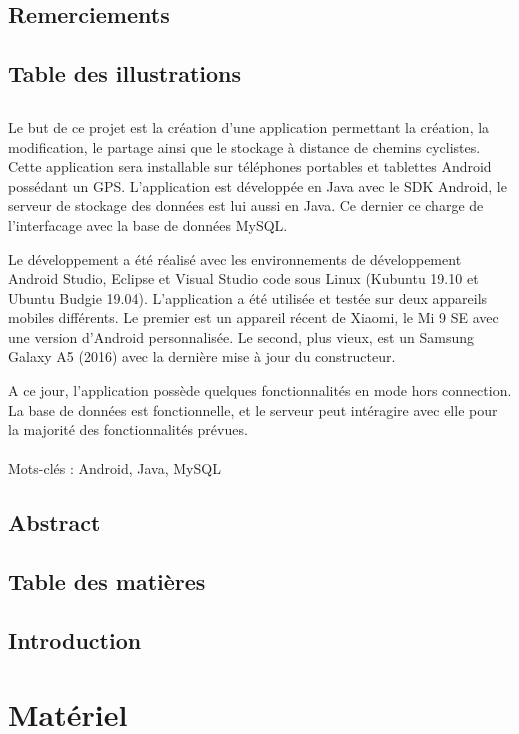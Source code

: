 \documentclass[a4paper, 12pt]{report}
\begin{document}
\section*{Remerciements}
\section*{Table des illustrations}
\newpage
\section*{}
	\indent
	Le but de ce projet est la création d'une application permettant la création, la modification, le partage ainsi que le stockage à distance de chemins cyclistes. 
	Cette application sera installable sur téléphones portables et tablettes Android possédant un GPS. L'application est développée en Java avec le SDK Android, le serveur de stockage des données est lui aussi en Java.
	Ce dernier ce charge de l'interfacage avec la base de données MySQL.
	\\\par
	Le développement a été réalisé avec les environnements de développement Android Studio, Eclipse et Visual Studio code sous Linux (Kubuntu 19.10 et Ubuntu Budgie 19.04). L'application a été utilisée et testée sur deux appareils mobiles différents.
	Le premier est un appareil récent de Xiaomi, le Mi 9 SE avec une version d'Android personnalisée.
	Le second, plus vieux, est un Samsung Galaxy A5 (2016) avec la dernière mise à jour du constructeur.
	\\\par
	A ce jour, l'application possède quelques fonctionnalités en mode hors connection.
	La base de données est fonctionnelle, et le serveur peut intéragire avec elle pour la majorité des fonctionnalités prévues.
	\\\\
	Mots-clés : Android, Java, MySQL
\section*{Abstract}
\section*{Table des matières}
\section*{Introduction}

\chapter{Matériel}
\end{document}
